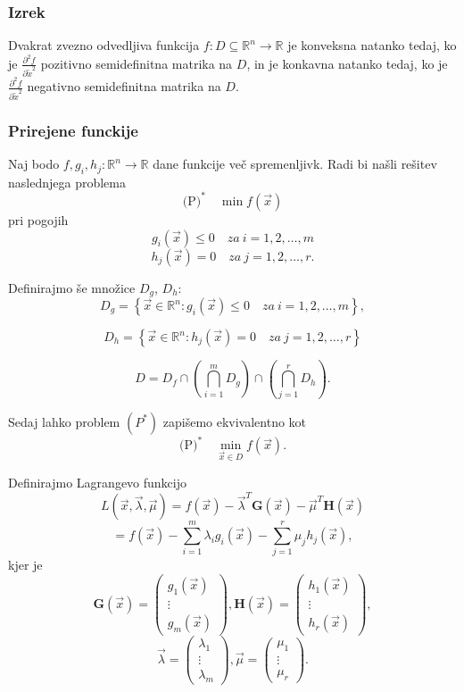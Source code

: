 \documentclass{article}
\begin{document}
\begin{multicols}{2}
\subsubsection{Izrek} 
Dvakrat zvezno odvedljiva funkcija \( f: D \subseteq \mathbb{R}^n \rightarrow \mathbb{R} \) je konveksna natanko tedaj, 
ko je \( \frac{\partial^2 f}{\partial \tilde{x}^2} \) pozitivno semidefinitna matrika na \( D \), in je konkavna natanko tedaj, 
ko je \( \frac{\partial^2 f}{\partial \tilde{x}^2} \) negativno semidefinitna matrika na \( D \).

\subsubsection{Prirejene funckije}

Naj bodo \( f, g_i, h_j: \mathbb{R}^n \rightarrow \mathbb{R} \) dane funkcije več spremenljivk. Radi bi našli rešitev naslednjega problema
\[
\text{(P)}^* \quad \min f(\vec{x})
\]
pri pogojih
\[
g_i(\vec{x}) \leq 0 \quad za \ i = 1,2,\ldots,m
\]
\[
h_j(\vec{x}) = 0 \quad za \ j = 1,2,\ldots,r.
\]

Definirajmo še množice \( D_g \), \( D_h \):
\[
D_g = \left\{ \vec{x} \in \mathbb{R}^n : g_i(\vec{x}) \leq 0 \quad za \ i = 1,2,\ldots,m \right\},
\]

\[
D_h = \left\{ \vec{x} \in \mathbb{R}^n : h_j(\vec{x}) = 0 \quad za \ j = 1,2,\ldots,r \right\}
\]

\[
D = D_f \cap \left( \bigcap_{i=1}^m D_g \right) \cap \left( \bigcap_{j=1}^r D_h \right).
\]

Sedaj lahko problem \( (P^*) \) zapišemo ekvivalentno kot
\[
    \text{(P)}^* \quad \min_{\vec{x} \in D} f(\vec{x}).
\]

Definirajmo Lagrangevo funkcijo
\[
L(\vec{x}, \vec{\lambda}, \vec{\mu}) = f(\vec{x}) - \vec{\lambda}^T \mathbf{G}(\vec{x}) - \vec{\mu}^T \mathbf{H}(\vec{x}) 
\]
\[
= f(\vec{x}) - \sum_{i=1}^{m} \lambda_i g_i(\vec{x}) - \sum_{j=1}^{r} \mu_j h_j(\vec{x}),
\]
kjer je
\[
\mathbf{G}(\vec{x}) = 
\begin{pmatrix}
g_1(\vec{x}) \\
\vdots \\
g_m(\vec{x})
\end{pmatrix},
\mathbf{H}(\vec{x}) = 
\begin{pmatrix}
h_1(\vec{x}) \\
\vdots \\
h_r(\vec{x})
\end{pmatrix},
\]
\[
\vec{\lambda} = 
\begin{pmatrix}
\lambda_1 \\
\vdots \\
\lambda_m
\end{pmatrix},
\vec{\mu} = 
\begin{pmatrix}
\mu_1 \\
\vdots \\
\mu_r
\end{pmatrix}.
\]


\end{multicols}
\end{document}
